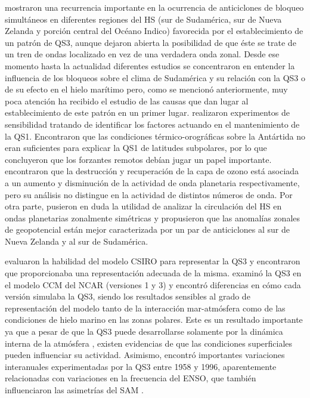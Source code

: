 \documentclass[spanish,a4paper,12pt,oneside]{book}
\begin{document}
\citet{Trenberth1985} mostraron una recurrencia importante en la
ocurrencia de anticiclones de bloqueo simultáneos en diferentes regiones
del HS (sur de Sudamérica, sur de Nueva Zelanda y porción central del
Océano Indico) favorecida por el establecimiento de un patrón de QS3,
aunque dejaron abierta la posibilidad de que éste se trate de un tren de
ondas localizado en vez de una verdadera onda zonal. Desde ese momento
hasta la actualidad diferentes estudios se concentraron en entender la
influencia de los bloqueos sobre el clima de Sudamérica y su relación
con la QS3 \citep[ej.][]{Rao2004} o de su efecto en el hielo marítimo
\citep[ej.][]{Raphael2007} pero, como se mencionó anteriormente, muy
poca atención ha recibido el estudio de las causas que dan lugar al
establecimiento de este patrón en un primer lugar. \citet{Quintanar1995}
realizaron experimentos de sensibilidad tratando de identificar los
factores actuando en el mantenimiento de la QS1. Encontraron que las
condiciones térmico-orográficas sobre la Antártida no eran suficientes
para explicar la QS1 de latitudes subpolares, por lo que concluyeron que
los forzantes remotos debían jugar un papel importante. \citet{Wang2013}
encontraron que la destrucción y recuperación de la capa de ozono está
asociada a un aumento y disminución de la actividad de onda planetaria
respectivamente, pero su análisis no distingue en la actividad de
distintos números de onda. Por otra parte, \citet{Hobbs2010} pusieron en
duda la utilidad de analizar la circulación del HS en ondas planetarias
zonalmente simétricas y propusieron que las anomalías zonales de
geopotencial están mejor caracterizada por un par de anticiclones al sur
de Nueva Zelanda y al sur de Sudamérica.

\citet{Cai1999} evaluaron la habilidad del modelo CSIRO para representar
la QS3 y encontraron que proporcionaba una representación adecuada de la
misma. \citet{Raphael1998} examinó la QS3 en el modelo CCM del NCAR
(versiones 1 y 3) y encontró diferencias en cómo cada versión simulaba
la QS3, siendo los resultados sensibles al grado de representación del
modelo tanto de la interacción mar-atmósfera como de las condiciones de
hielo marino en las zonas polares. Este es un resultado importante ya
que a pesar de que la QS3 puede desarrollarse solamente por la dinámica
interna de la atmósfera \citep[ej.][]{Simpson2013}, existen evidencias
de que las condiciones superficiales pueden influenciar su actividad.
Asimismo, \citet{Raphael2003} encontró importantes variaciones
interanuales experimentadas por la QS3 entre 1958 y 1996, aparentemente
relacionadas con variaciones en la frecuencia del ENSO, que también
influenciaron las asimetrías del SAM \citep{Fogt2012}.
\end{document}
